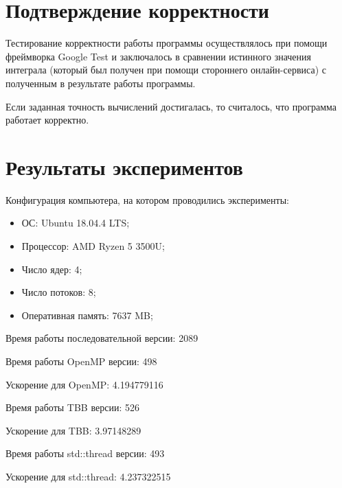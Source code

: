 \documentclass{article}
\begin{document}
\section{Подтверждение корректности}

\par Тестирование корректности работы программы осуществлялось при помощи фреймворка Google Test и заключалось в сравнении истинного значения интеграла (который был получен при помощи стороннего онлайн-сервиса) с полученным в результате работы программы.

\par Если заданная точность вычислений достигалась, то считалось, что программа работает корректно. 

\newpage

\section{Результаты экспериментов}
Конфигурация компьютера, на котором проводились эксперименты:

\begin{itemize}
\item ОС: Ubuntu 18.04.4 LTS;
\item Процессор: AMD Ryzen 5 3500U;
\item Число ядер: 4;
\item Число потоков: 8;
\item Оперативная память: 7637 MB;
\end{itemize}
\vspace{\baselineskip}

\par Время работы последовательной версии: 2089	
\vspace{\baselineskip}

\par Время работы OpenMP версии: 498
\par Ускорение для OpenMP: 4.194779116	
\vspace{\baselineskip}

\par Время работы TBB версии: 526
\par Ускорение для TBB: 3.97148289
\vspace{\baselineskip}

\par Время работы std::thread версии: 493
\par Ускорение для std::thread: 4.237322515
\vspace{\baselineskip}
\end{document}
